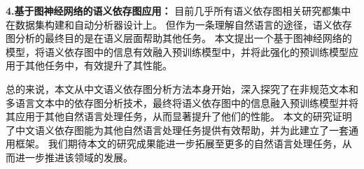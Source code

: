 \begin{cabstract}
\textbf{4.基于图神经网络的语义依存图应用：}
目前几乎所有语义依存图相关研究都集中在数据集构建和自动分析器设计上。
但作为一条理解自然语言的途径，语义依存图分析的最终目的是在语义层面帮助其他任务。
本文提出一个基于图神经网络的模型，将语义依存图中的信息有效融入预训练模型中，并将此强化的预训练模型应用于其他任务中，有效提升了其性能。

总的来说，本文从中文语义依存图分析方法本身开始，深入探究了在非规范文本和多语言文本中的依存图分析技术，最终将语义依存图中的信息融入预训练模型并将其应用于其他自然语言处理任务，从而显著提升了他们的性能。
本文的研究证明了中文语义依存图能为其他自然语言处理任务提供有效帮助，并为此建立了一套通用框架。
我们期待本文的研究成果能进一步拓展至更多的自然语言处理任务，从而进一步推进该领域的发展。

\end{cabstract}

